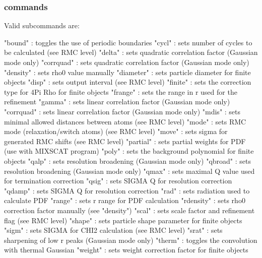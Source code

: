 \subsubsection{commands}
Valid subcommands are: 
\par
\begin{MacVerbatim}
"bound"    : toggles the use of periodic boundaries
"cycl"     : sets number of cycles to be calculated (see RMC level)
"delta"    : sets quadratic correlation factor (Gaussian mode only)
"corrquad" : sets quadratic correlation factor (Gaussian mode only)
"density"  : sets rho0 value manually
"diameter" : sets particle diameter for finite objects
"disp"     : sets output interval (see RMC level)
"finite"   : sets the correction type for 4Pi Rho for finite objects
"frange"   : sets the range in r used for the refinement
"gamma"    : sets linear correlation factor (Gaussian mode only)
"corrquad" : sets linear correlation factor (Gaussian mode only)
"mdis"     : sets minimal allowed distances between atoms (see RMC level)
"mode"     : sets RMC mode (relaxation/switch atoms) (see RMC level)
"move"     : sets sigma for generated RMC shifts (see RMC level)
"partial"  : sets partial weights for PDF (use with MIXSCAT program)
"poly"     : sets the background polynomial for finite objects
"qalp"     : sets resolution broadening (Gaussian mode only)
"qbroad"   : sets resolution broadening (Gaussian mode only)
"qmax"     : sets maximal Q value used for termination correction
"qsig"     : sets SIGMA Q for resolution correction
"qdamp"    : sets SIGMA Q for resolution correction
"rad"      : sets radiation used to calculate PDF
"range"    : sets r range for PDF calculation
"rdensity" : sets rho0 correction factor manually (see "density")
"scal"     : sets scale factor and refinement flag (see RMC level)
"shape"    : sets particle shape parameter for finite objects
"sigm"     : sets SIGMA for CHI2 calculation (see RMC level)
"srat"     : sets sharpening of low r peaks (Gaussian mode only)
"therm"    : toggles the convolution with thermal Gaussian
"weight"   : sets weight correction factor for finite objects
\end{MacVerbatim}
